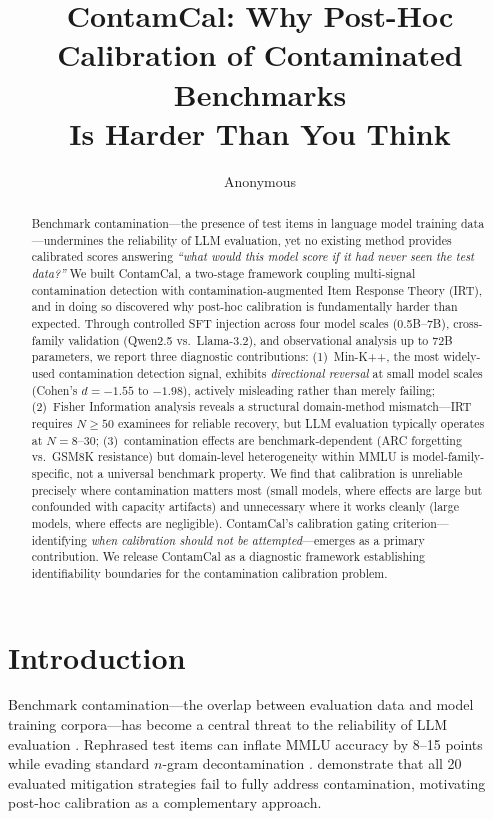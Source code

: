 \documentclass[11pt,a4paper]{article}
\title{ContamCal: Why Post-Hoc Calibration of Contaminated Benchmarks\\Is Harder Than You Think}
\author{Anonymous}
\begin{document}
\maketitle

\begin{abstract}
Benchmark contamination---the presence of test items in language model training data---undermines the reliability of LLM evaluation, yet no existing method provides calibrated scores answering \emph{``what would this model score if it had never seen the test data?''}
We built ContamCal, a two-stage framework coupling multi-signal contamination detection with contamination-augmented Item Response Theory (IRT), and in doing so discovered why post-hoc calibration is fundamentally harder than expected.
Through controlled SFT injection across four model scales (0.5B--7B), cross-family validation (Qwen2.5 vs.\ Llama-3.2), and observational analysis up to 72B parameters, we report three diagnostic contributions:
(1)~Min-K++, the most widely-used contamination detection signal, exhibits \emph{directional reversal} at small model scales (Cohen's $d = -1.55$ to $-1.98$), actively misleading rather than merely failing;
(2)~Fisher Information analysis reveals a structural domain-method mismatch---IRT requires $N \geq 50$ examinees for reliable recovery, but LLM evaluation typically operates at $N = 8$--$30$;
(3)~contamination effects are benchmark-dependent (ARC forgetting vs.\ GSM8K resistance) but domain-level heterogeneity within MMLU is model-family-specific, not a universal benchmark property.
We find that calibration is unreliable precisely where contamination matters most (small models, where effects are large but confounded with capacity artifacts) and unnecessary where it works cleanly (large models, where effects are negligible).
ContamCal's calibration gating criterion---identifying \emph{when calibration should not be attempted}---emerges as a primary contribution.
We release ContamCal as a diagnostic framework establishing identifiability boundaries for the contamination calibration problem.
\end{abstract}

\section{Introduction}
\label{sec:intro}

Benchmark contamination---the overlap between evaluation data and model training corpora---has become a central threat to the reliability of LLM evaluation \citep{sainz2023nlp,balloccu2024leak,dong2024generalization}.
Rephrased test items can inflate MMLU accuracy by 8--15 points while evading standard $n$-gram decontamination \citep{yang2023rethinking,golchin2024time}.
\citet{jiang2024investigating} demonstrate that all 20 evaluated mitigation strategies fail to fully address contamination, motivating post-hoc calibration as a complementary approach.
\end{document}
